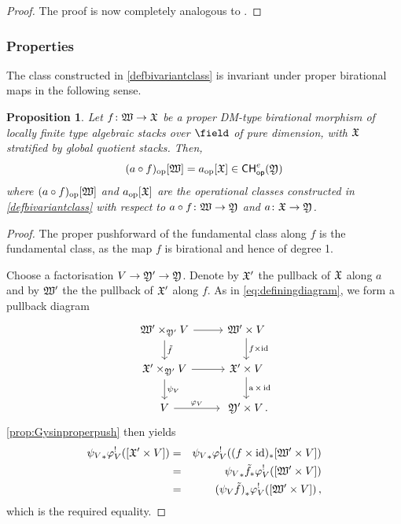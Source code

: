 \documentclass[a4paper,12pt]{article} %
\newcommand{\on}[1]{\operatorname{#1}}
\theoremstyle{definition}
\theoremstyle{plain}%
\newtheorem{proposition}[definition]{Proposition}
\renewcommand{\phi}{\varphi}
\newcommand{\Chow}{\mathsf{CH}}
\newcommand{\CHop}{\Chow_{\mathsf{op}}}
\begin{document}
\begin{proof}
The proof is now completely analogous to \cite[Theorem 17.1]{Fulton1984Intersection-th}. %
\end{proof}

\subsubsection{Properties}
The class constructed in \cref{defbivariantclass} is invariant under proper birational maps in the following sense.
\begin{proposition}\label{prop:invarianceproperbirat}
Let $f\colon \frak W \to \frak X$ be a proper DM-type birational morphism of locally finite type algebraic stacks over ${\field}$ of pure dimension, with $\frak X$ stratified by global quotient stacks. Then,
\[(a\circ f)_{\on{op}}[\frak W] = a_{\on{op}}[\frak X] \in \CHop^e(\frak Y)\]
where $(a\circ f)_{\on{op}}[\frak W]$ and $a_{\on{op}}[\frak X]$ are the operational classes constructed in \cref{defbivariantclass} with respect to $a\circ f\colon \frak W \to \frak Y$ and $a\colon \frak X \to \frak Y$.
\end{proposition}

\begin{proof}
The proper pushforward of the fundamental class along $f$ is the fundamental class, as the map $f$ is birational and hence of degree 1. 

Choose a factorisation $V \to\frak Y' \to\frak Y$. Denote by $\frak X'$ the pullback of $\frak X$ along $a$ and by $\frak W'$ the the pullback of $\frak X'$ along $f$. As in \eqref{eq:definingdiagram}, we
form a pullback diagram 
\begin{equation} 
 \begin{tikzcd}
   \frak W' \times_{\frak Y'} V \arrow[r] \arrow[d, "\tilde{f}"] & \frak W' \times V \arrow[d, "f \times \on{id}"]  \\
  \frak X' \times_{\frak Y'} V \arrow[r] \arrow[d, "\psi_V"] & \frak X' \times V \arrow[d, "\on{a} \times \on{id}"]  \\
  V \arrow[r, "\phi_V"] & \ \frak Y' \times V\, . 
\end{tikzcd}
\end{equation}
 \cref{prop:Gysinproperpush} then yields
\begin{eqnarray*}
{\psi_V}_* \phi_V^!([\frak X' \times V]) &=&  {\psi_V}_* \phi_V^!((f \times \on{id})_*[\frak W' \times V])\\
&=& {\psi_V}_* \tilde{f}_* \phi_V^! ([\frak W' \times V])\\
&= &{(\psi_V \tilde{f})}_* \phi_V^! ([\frak W' \times V])\, ,
\end{eqnarray*}
which is the required equality. 
\end{proof}
\end{document}
